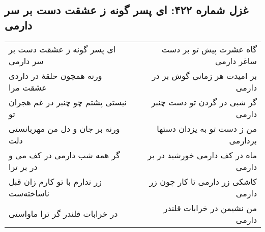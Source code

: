\begin{center}
\section*{غزل شماره ۴۲۲: ای پسر گونه ز عشقت دست بر سر دارمی}
\label{sec:422}
\begin{longtable}{l p{0.5cm} r}
ای پسر گونه ز عشقت دست بر سر دارمی
&&
گاه عشرت پیش تو بر دست ساغر دارمی
\\
ورنه همچون حلقهٔ در داردی عشقت مرا
&&
بر امیدت هر زمانی گوش بر در دارمی
\\
نیستی پشتم چو چنبر در غم هجران تو
&&
گر شبی در گردن تو دست چنبر دارمی
\\
ورنه بر جان و دل من مهربانستی دلت
&&
من ز دست تو به یزدان دستها بردارمی
\\
گر همه شب دارمی در کف می و در بر ترا
&&
ماه در کف دارمی خورشید در بر دارمی
\\
زر ندارم با تو کارم زان قبل ناساخته‌ست
&&
کاشکی زر دارمی تا کار چون زر دارمی
\\
در خرابات قلندر گر ترا ماواستی
&&
من نشیمن در خرابات قلندر دارمی
\\
\end{longtable}
\end{center}
